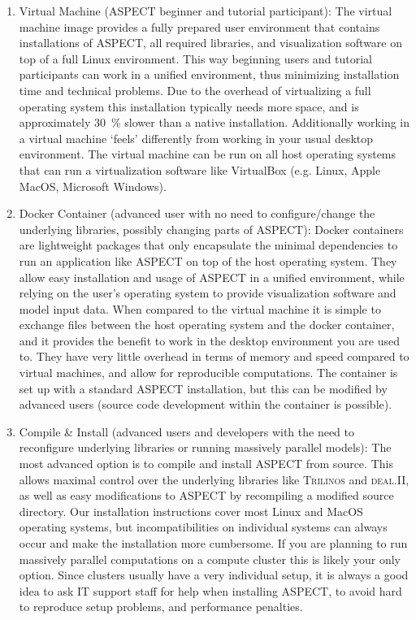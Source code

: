 \documentclass{article}
\newcommand{\dealii}{{\textsc{deal.II}}}
\newcommand{\trilinos}{{\textsc{Trilinos}}}
\newcommand{\aspect}{\textsc{ASPECT}}
\begin{document}
\begin{enumerate}
\item Virtual Machine (\aspect{} beginner and tutorial participant): The
virtual machine image provides a fully prepared user environment that contains
installations of \aspect{}, all required libraries, and visualization software
on top of a full Linux environment. This way beginning users and tutorial
participants can work in a unified  environment, thus minimizing installation
time and technical problems. Due to the overhead of virtualizing a full
operating system this installation typically needs more space, and is
approximately 30~\% slower than a native installation. Additionally working in a
virtual machine `feels' differently from working in your usual desktop
environment. The virtual machine can be run on all host operating systems that
can run a virtualization software like VirtualBox (e.g. Linux, Apple MacOS,
Microsoft Windows).

\item Docker Container (advanced user with no need to configure/change the
underlying libraries, possibly changing parts of \aspect): Docker containers are
lightweight packages that only encapsulate the minimal dependencies to run an
application like \aspect{} on top of the host operating system. They allow easy
installation and usage of \aspect{} in a unified environment, while relying on
the user's operating system to provide visualization software and model input
data. When compared to the virtual machine it is simple to exchange files
between the host operating system and the docker container, and it provides the
benefit to work in the desktop environment you are used to. They have very
little overhead in terms of memory and speed compared to virtual machines, and
allow for reproducible computations. The container is set up with a standard
\aspect{} installation, but this can be modified by advanced users (source code
development within the container is possible).

\item Compile \& Install (advanced users and developers with the need to
reconfigure underlying libraries or running massively parallel models): The most
advanced option is to compile and install \aspect{} from source. This allows
maximal control over the underlying libraries like \trilinos{} and \dealii{}, as
well as easy modifications to \aspect{} by recompiling a modified source
directory. Our installation instructions cover most Linux and MacOS operating
systems, but incompatibilities on individual systems can always occur and make
the installation more cumbersome. If you are planning to run massively parallel
computations on a compute cluster this is likely your only option. Since
clusters usually have a very individual setup, it is always a good idea to ask
IT support staff for help when installing \aspect{}, to avoid hard to reproduce
setup problems, and performance penalties.
\end{enumerate}
\end{document}
